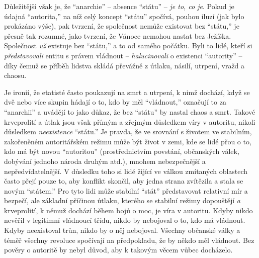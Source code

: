 \documentclass{book}
\begin{document}
Důležitější však je, že \enquote{anarchie} -- absence \enquote{státu} -- \emph{je to, co je}. Pokud je údajná \enquote{autorita,} na níž celý koncept \enquote{státu} spočívá, pouhou iluzí (jak bylo prokázáno výše), pak tvrzení, že společnost nemůže existovat bez \enquote{státu,} je přesně tak rozumné, jako tvrzení, že Vánoce nemohou nastat bez Ježíška. Společnost \emph{už} existuje bez \enquote{státu,} a to od samého počátku. Byli to lidé, kteří si \emph{představovali} entitu s právem vládnout -- \emph{halucinovali} o existenci \enquote{autority} -- díky čemuž se příběh lidstva skládá převážně z útlaku, násilí, utrpení, vražd a chaosu.

Je ironií, že etatisté často poukazují na smrt a utrpení, k nimž dochází, když se dvě nebo více skupin hádají o to, kdo by měl \enquote{vládnout,} označují to za \enquote{anarchii} a uvádějí to jako důkaz, že bez \enquote{státu} by nastal chaos a smrt. Takové krveprolití a útlak jsou však přímým a zřejmým důsledkem víry v autoritu, nikoli důsledkem \emph{neexistence} \enquote{státu.} Je pravda, že ve srovnání s životem ve stabilním, zakořeněném autoritářském režimu může být život v zemi, kde se lidé přou o to, kdo má být novou \enquote{autoritou} (prostřednictvím povstání, občanských válek, dobývání jednoho národa druhým atd.), mnohem nebezpečnější a nepředvídatelnější. V důsledku toho si lidé žijící ve válkou zmítaných oblastech často přejí pouze to, aby konflikt skončil, aby jedna strana zvítězila a stala se novým \enquote{státem.} Pro tyto lidi může stabilní \enquote{stát} představovat relativní mír a bezpečí, ale základní příčinou útlaku, kterého se stabilní režimy dopouštějí \emph{a} krveprolití, k němuž dochází během bojů o moc, je víra v autoritu. Kdyby nikdo nevěřil v legitimní vládnoucí třídu, nikdo by nebojoval o to, kdo má vládnout. Kdyby neexistoval trůn, nikdo by o něj nebojoval. Všechny občanské války a téměř všechny revoluce spočívají na předpokladu, že by někdo měl vládnout. Bez pověry o autoritě by nebyl důvod, aby k takovým věcem vůbec docházelo.
\end{document}
